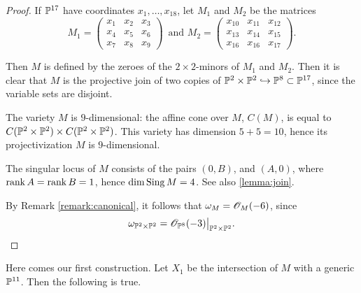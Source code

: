 \begin{proof}
If $\P^{17}$ have coordinates $x_1,\ldots,x_{18}$, let $M_1$ and $M_2$ be the matrices
\[
M_1 = \begin{pmatrix}
x_1 & x_2 & x_3 \\
x_4 & x_5 & x_6 \\
x_7 & x_8 & x_9 
\end{pmatrix}\,
\text{ and }
M_2 = \begin{pmatrix}
x_{10} & x_{11} & x_{12} \\
x_{13} & x_{14} & x_{15} \\
x_{16} & x_{16} & x_{17}
\end{pmatrix}.
\]

Then $M$ is defined by the zeroes of the $2 \times 2$-minors of $M_1$ and $M_2$. Then it is clear that $M$ is the projective join of two copies of $\mathbb P^2 \times \mathbb P^2 \hookrightarrow \mathbb P^8 \subset \P^{17}$, since the variable sets are disjoint.

The variety $M$ is $9$-dimensional: the affine cone over $M$, $C(M)$, is equal to $C(\mathbb P^2 \times \P^2) \times C(\mathbb P^2 \times \P^2)$. This variety has dimension $5+5=10$, hence its projectivization $M$ is $9$-dimensional. 

The singular locus of $M$ consists of the pairs $(0,B)$, and $(A,0)$, where $\rank A= \rank B = 1$, hence $\dim \Sing M = 4$. See also \cref{lemma:join}.

By Remark \ref{remark:canonical}, it follows that $\omega_M = \OO_M(-6)$, since 
\[
\omega_{\P^2 \times \P^2} = \restr{\OO_{\P^8}(-3)}{\P^2 \times \P^2}.
\]
\end{proof}

Here comes our first construction. Let $X_1$ be the intersection of $M$ with a generic $\P^{11}$. Then the following is true.

